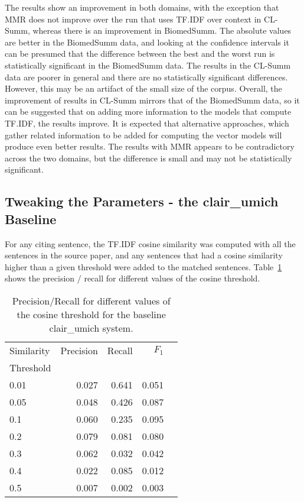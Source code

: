 \documentclass[11pt]{article}
\begin{document}
The results show an improvement in both domains, with the exception that MMR does 
not improve over the run that uses TF.IDF over context in CL-Summ, whereas there is 
an improvement in BiomedSumm. The absolute values are better in the BiomedSumm data, 
and looking at the confidence intervals it can be presumed that the difference between 
the best and the worst run is statistically significant in the BiomedSumm data. 
The results in the CL-Summ data are poorer in general and there are no statistically 
significant differences. However, this may be an artifact of the small size of the corpus. 
Overall, the improvement of results in CL-Summ mirrors that of the BiomedSumm data, so it 
can be suggested that on adding more information to the models that compute TF.IDF, the 
results improve. It is expected that alternative approaches, which gather related information 
to be added for computing the vector models will produce even better results. The results 
with MMR appears to be contradictory across the two domains, but the difference is small 
and may not be statistically significant.

\subsection{Tweaking the Parameters - the clair\_umich Baseline}
For any citing sentence, the TF.IDF cosine similarity was computed with all the sentences in the source paper, and any sentences that had a cosine similarity higher than a given threshold were added to the matched sentences. Table~\ref{tab:clairumichbaseline} shows the precision / recall for different values of the cosine threshold.
\begin{table}[h]
  \centering
  \begin{tabular}{|l|r|r|r|r|}
  	\hline
	Similarity & Precision & Recall & $F_1$ \\
	Threshold & & & \\
	\hline
	0.01 & 0.027 & 0.641 & 0.051\\
	0.05 & 0.048 & 0.426 & 0.087\\
	0.1 & 0.060 & 0.235 & 0.095\\
	0.2 & 0.079 & 0.081 & 0.080\\
	0.3 & 0.062 & 0.032 & 0.042\\
	0.4 & 0.022 & 0.085 & 0.012\\
	0.5 & 0.007 &  0.002 & 0.003\\
	\hline
  \end{tabular}
  \caption{Precision/Recall for different values of the cosine threshold 
  			for the baseline clair\_umich system.}
  \label{tab:clairumichbaseline}
\end{table}
\end{document}
